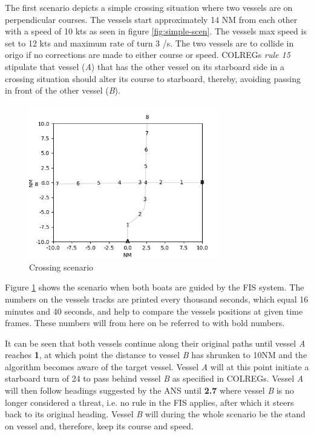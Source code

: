 The first scenario depicts a simple crossing situation where two vessels are on perpendicular courses. The vessels start  approximately 14 NM from each other with a speed of 10 kts as seen in figure \ref{fig:simple-scen}. The vessels max speed is set to 12 kts and maximum rate of turn 3 \textdegree /s. The two vessels are to  collide in origo if no corrections are made to either course or speed. COLREGs \textit{rule 15} stipulate that vessel (\textit{A}) that has the other vessel on its starboard side  in a crossing situation should alter its course to starboard, thereby, avoiding passing in front of the other vessel (\textit{B}).
\begin{figure}[H]
    \centering
    \includegraphics[width=0.75\textwidth,height=0.75\textheight,keepaspectratio]{../src/img/crossing_res.png}
    \caption{Crossing scenario}
    \label{fig:simple-scen-res}
\end{figure}

Figure \ref{fig:simple-scen-res} shows the scenario when both boats are guided by the FIS system. The numbers on the vessels tracks are printed every thousand seconds, which equal 16 minutes and 40 seconds, and help to compare the vessels positions at  given time frames. These numbers will from here on be referred to with bold numbers.

It can be seen that both vessels continue along their original paths until vessel \textit{A} reaches \textbf{1}, at which point the distance to vessel \textit{B} has shrunken to 10NM and the algorithm becomes aware of the target vessel. Vessel \textit{A} will at this point initiate a starboard turn  of 24 \textdegree to pass behind vessel \textit{B} as specified in COLREGs. Vessel \textit{A} will then follow headings suggested by the ANS until \textbf{2.7} where  vessel \textit{B} is no longer considered a threat, i.e. no rule in the FIS applies, after which it steers back to its original heading. Vessel \textit{B} will during the whole scenario be the stand on vessel and, therefore, keep its course and speed.

